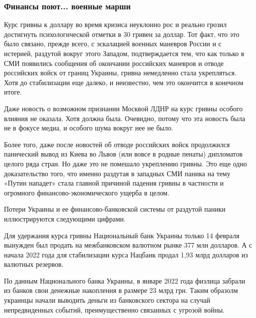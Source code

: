  
 
 
 
 

\subsubsection{Финансы поют... военные марши}
\label{sec:17_02_2022.stz.news.ua.fraza.1.kak_zapadnyje_partnery_opuskajut_ukrainu.3.finansy_marshi}

Курс гривны к доллару во время кризиса неуклонно рос и реально грозил
достигнуть психологической отметки в 30 гривен за доллар. Тот факт, что это
было связано, прежде всего, с эскалацией военных маневров России и с истерией,
раздутой вокруг этого Западом, подтверждается тем, что как только в СМИ
появились сообщения об окончании российских маневров и отводе российских войск
от границ Украины, гривна немедленно стала укрепляться. Хотя до стабилизации
еще далеко, и неизвестно, чем это окончится в конечном итоге.

Даже новость о возможном признании Москвой ЛДНР на курс гривны особого влияния
не оказала. Хотя должна была. Очевидно, потому что эта новость была не в фокусе
медиа, и особого шума вокруг нее не было.

Более того, даже после новостей об отводе российских войск продолжился
панический вывод из Киева во Львов (или вовсе в родные пенаты) дипломатов
целого ряда стран. Но даже это не помешало укреплению гривны. Это еще одно
доказательство того, что именно раздутая в западных СМИ паника на тему «Путин
нападет» стала главной причиной падения гривны в частности и огромного
финансово-экономического ущерба в целом.

Потери Украины и ее финансово-банковской системы от раздутой паники
иллюстрируются следующими цифрами.

Для удержания курса гривны Национальный банк Украины только 14 февраля вынужден
был продать на межбанковском валютном рынке 377 млн долларов. А с начала 2022
года для стабилизации курса Нацбанк продал 1,93 млрд долларов из валютных
резервов.

По данным Национального банка Украины, в январе 2022 года физлица забрали из
банков свои денежные накопления в размере 23 млрд грн. Таким образолм украинцы
начали выводить деньги из банковского сектора на случай непредвиденных событий,
преимущественно связанных с угрозой войны.

